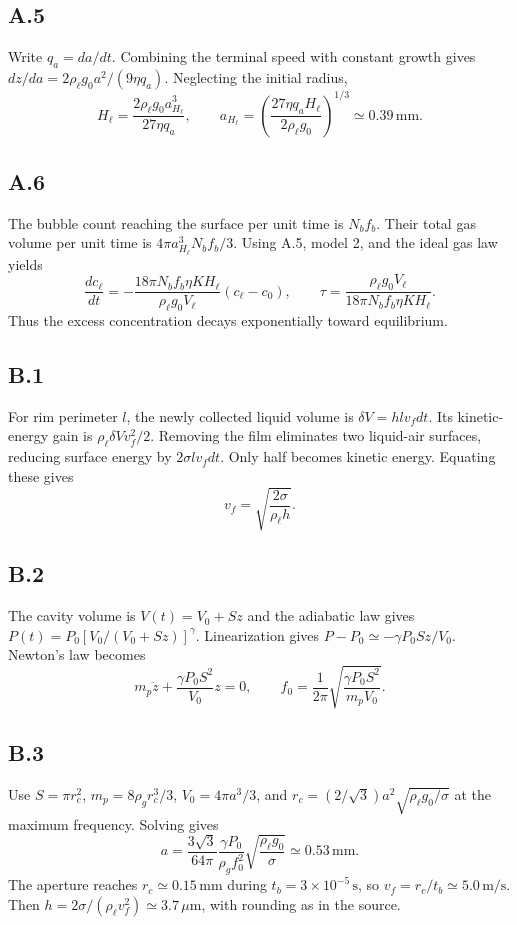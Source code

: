 \documentclass{article}
\begin{document}
\subsection*{A.5}
Write $q_a=da/dt$. Combining the terminal speed with constant growth gives $dz/da=2\rho_\ell g_0a^2/(9\eta q_a)$. Neglecting the initial radius,
\[H_\ell=\frac{2\rho_\ell g_0a_{H_\ell}^3}{27\eta q_a},\qquad a_{H_\ell}=\left(\frac{27\eta q_aH_\ell}{2\rho_\ell g_0}\right)^{1/3}\simeq0.39\,\mathrm{mm}.\]
\subsection*{A.6}
The bubble count reaching the surface per unit time is $N_bf_b$. Their total gas volume per unit time is $4\pi a_{H_\ell}^3N_bf_b/3$. Using A.5, model 2, and the ideal gas law yields
\[\frac{dc_\ell}{dt}=-\frac{18\pi N_bf_b\eta KH_\ell}{\rho_\ell g_0V_\ell}(c_\ell-c_0),\qquad \tau=\frac{\rho_\ell g_0V_\ell}{18\pi N_bf_b\eta KH_\ell}.\]
Thus the excess concentration decays exponentially toward equilibrium.
\subsection*{B.1}
For rim perimeter $l$, the newly collected liquid volume is $\delta V=hlv_fdt$. Its kinetic-energy gain is $\rho_\ell\delta Vv_f^2/2$. Removing the film eliminates two liquid-air surfaces, reducing surface energy by $2\sigma lv_fdt$. Only half becomes kinetic energy. Equating these gives
\[v_f=\sqrt{\frac{2\sigma}{\rho_\ell h}}.\]
\subsection*{B.2}
The cavity volume is $V(t)=V_0+Sz$ and the adiabatic law gives $P(t)=P_0[V_0/(V_0+Sz)]^\gamma$. Linearization gives $P-P_0\simeq-\gamma P_0Sz/V_0$. Newton's law becomes
\[m_p\ddot z+\frac{\gamma P_0S^2}{V_0}z=0,\qquad f_0=\frac1{2\pi}\sqrt{\frac{\gamma P_0S^2}{m_pV_0}}.\]
\subsection*{B.3}
Use $S=\pi r_c^2$, $m_p=8\rho_gr_c^3/3$, $V_0=4\pi a^3/3$, and $r_c=(2/\sqrt3)a^2\sqrt{\rho_\ell g_0/\sigma}$ at the maximum frequency. Solving gives
\[a=\frac{3\sqrt3}{64\pi}\frac{\gamma P_0}{\rho_gf_0^2}\sqrt{\frac{\rho_\ell g_0}{\sigma}}\simeq0.53\,\mathrm{mm}.\]
The aperture reaches $r_c\simeq0.15\,\mathrm{mm}$ during $t_b=3\times10^{-5}\,\mathrm s$, so $v_f=r_c/t_b\simeq5.0\,\mathrm{m/s}$. Then $h=2\sigma/(\rho_\ell v_f^2)\simeq3.7\,\mu\mathrm m$, with rounding as in the source.
\end{document}
